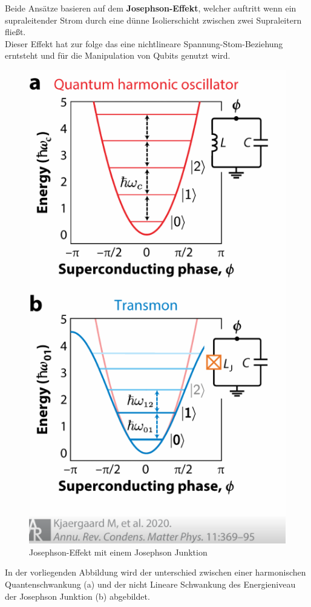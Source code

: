 Beide Ansätze basieren auf dem \textbf{Josephson-Effekt}, welcher auftritt wenn ein supraleitender Strom durch eine dünne Isolierschicht zwischen zwei Supraleitern fließt.\\
Dieser Effekt hat zur folge das eine nichtlineare Spannung-Stom-Beziehung erntsteht und für die Manipulation von Qubits genutzt wird.\\

\begin{figure}[H]
    \centering
    \includegraphics[width=0.75\linewidth]{img/JJ.png}
    \caption{Josephson-Effekt mit einem Josephson Junktion}
    \label{fig:Josephson-junktion}
\end{figure}

In der vorliegenden Abbildung wird der unterschied zwischen einer harmonischen Quantenschwankung (a) und der nicht Lineare Schwankung des Energieniveau der Josephson Junktion (b) abgebildet.\\

